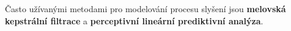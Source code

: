 
Často užívanými metodami pro modelování procesu slyšení jsou \textbf{melovská kepstrální filtrace} a \textbf{perceptivní lineární prediktivní analýza}.






